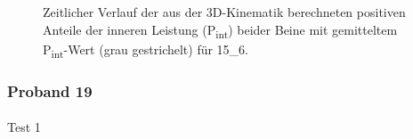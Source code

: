 \documentclass[
  letterpaper,
  DIV=11]{scrartcl}
\makeatletter
\let\oldparagraph\paragraph
\renewcommand{\paragraph}{
    \@ifstar
      \xxxParagraphStar
      \xxxParagraphNoStar
  }
\newcommand{\xxxParagraphStar}[1]{\oldparagraph*{#1}\mbox{}}
\newcommand{\xxxParagraphNoStar}[1]{\oldparagraph{#1}\mbox{}}
\makeatother
\begin{document}
\begin{figure}


\caption{\label{fig-PInt_Kinematik_15_6}Zeitlicher Verlauf der aus der
3D-Kinematik berechneten positiven Anteile der inneren Leistung
(P\textsubscript{int}) beider Beine mit gemitteltem
P\textsubscript{int}-Wert (grau gestrichelt) für 15\_6.}

\end{figure}%

\subsubsection{Proband 19}

\paragraph{Test 1}
\end{document}
